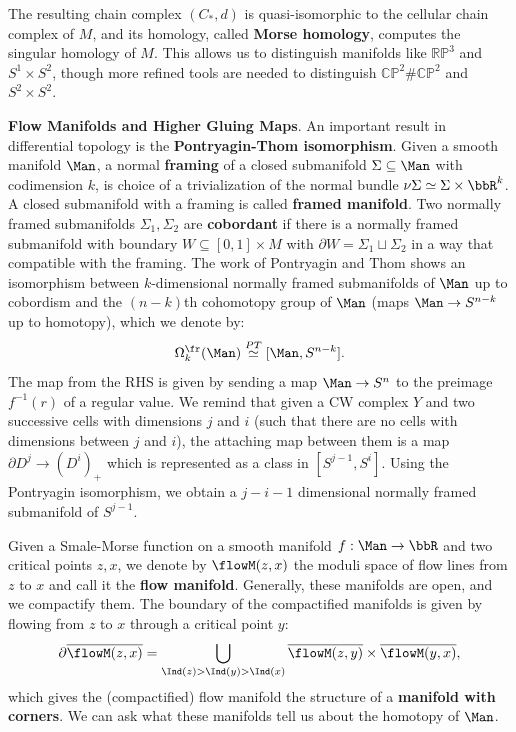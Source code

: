 The resulting chain complex $ (C_*, d) $ is quasi-isomorphic to the cellular chain complex of $ M $, and its homology, called \textbf{Morse homology}, computes the singular homology of $ M $. This allows us to distinguish manifolds like $ \mathbb{RP}^3 $ and $ S^1 \times S^2 $, though more refined tools are needed to distinguish $ \mathbb{CP}^2 \# \mathbb{CP}^2 $ and $ S^2 \times S^2 $.

\textbf{Flow Manifolds and Higher Gluing Maps}. An important result in differential topology is the \textbf{Pontryagin-Thom isomorphism}. Given a smooth manifold $\Man$, a normal \textbf{framing} of a closed submanifold $\Sigma \subseteq \Man$ with codimension $k$, is choice of a trivialization of the normal bundle $\nu \Sigma \simeq \Sigma\times \bbR^k$. A closed submanifold with a framing is called \textbf{framed manifold}. Two normally framed submanifolds $\Sigma_1, \Sigma_2$ are \textbf{cobordant} if there is a normally framed submanifold with boundary $W \subseteq [0,1] \times M$ with $\partial W = \Sigma_1 \sqcup \Sigma_2$ in a way that compatible with the framing. The work of Pontryagin and Thom shows an isomorphism between $k$-dimensional normally framed submanifolds of $\Man$ up to cobordism and the $(n-k)$th cohomotopy group of $\Man$ (maps $\Man \to S^{n-k}$ up to homotopy), which we denote by:
\begin{equation*}
    \Omega^{\fr}_k(\Man) \overset{PT}{\simeq} [\Man,S^{n-k}].
\end{equation*}
The map from the RHS is given by sending a map $\Man \to S^n$ to the preimage $f^{-1}(r)$ of a regular value.
We remind that given a CW complex $Y$ and two successive cells with dimensions $j$ and $i$ (such that there are no cells with dimensions between $j$ and $i$), the attaching map between them is a map $\partial D^j \to (D^i)_+$ which is represented as a class in $[S^{j-1},S^i]$. Using the Pontryagin isomorphism, we obtain a $j-i-1$ dimensional normally framed submanifold of $S^{j-1}$.

Given a Smale-Morse function on a smooth manifold $f:\Man \to \bbR$ and two critical points $z, x$, we denote by $\flowM(z,x)$ the moduli space of flow lines from $z$ to $x$ and call it the \textbf{flow manifold}. Generally, these manifolds are open, and we compactify them. The boundary of the compactified manifolds is given by flowing from $z$ to $x$ through a critical point $y$:
\begin{equation*}
    \partial \overline{\flowM(z,x)} = \bigcup_{\Ind(z) > \Ind(y) > \Ind(x)} \overline{\flowM(z,y)} \times \overline{\flowM(y,x)},
\end{equation*}
which gives the (compactified) flow manifold the structure of a \textbf{manifold with corners}. We can ask what these manifolds tell us about the homotopy of $\Man$.

